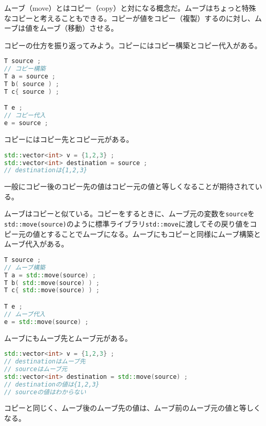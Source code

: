 

ムーブ（move）とはコピー（copy）と対になる概念だ。ムーブはちょっと特殊なコピーと考えることもできる。コピーが値をコピー（複製）するのに対し、ムーブは値をムーブ（移動）させる。

コピーの仕方を振り返ってみよう。コピーにはコピー構築とコピー代入がある。

\begin{lstlisting}[language={C++}]
T source ;
// コピー構築
T a = source ;
T b( source ) ;
T c{ source ) ;

T e ;
// コピー代入
e = source ;
\end{lstlisting}

コピーにはコピー先とコピー元がある。

\begin{lstlisting}[language={C++}]
std::vector<int> v = {1,2,3} ;
std::vector<int> destination = source ;
// destinationは{1,2,3}
\end{lstlisting}

一般にコピー後のコピー先の値はコピー元の値と等しくなることが期待されている。

ムーブはコピーと似ている。コピーをするときに、ムーブ元の変数を\texttt{source}を\texttt{std::move(source)}のように標準ライブラリ\texttt{std::move}に渡してその戻り値をコピー元の値とすることでムーブになる。ムーブにもコピーと同様にムーブ構築とムーブ代入がある。

\begin{lstlisting}[language={C++}]
T source ;
// ムーブ構築
T a = std::move(source) ;
T b( std::move(source) ) ;
T c{ std::move(source) ) ;

T e ;
// ムーブ代入
e = std::move(source) ;
\end{lstlisting}

ムーブにもムーブ先とムーブ元がある。

\begin{lstlisting}[language={C++}]
std::vector<int> v = {1,2,3} ;
// destinationはムーブ先
// sourceはムーブ元
std::vector<int> destination = std::move(source) ;
// destinationの値は{1,2,3}
// sourceの値はわからない
\end{lstlisting}

コピーと同じく、ムーブ後のムーブ先の値は、ムーブ前のムーブ元の値と等しくなる。


